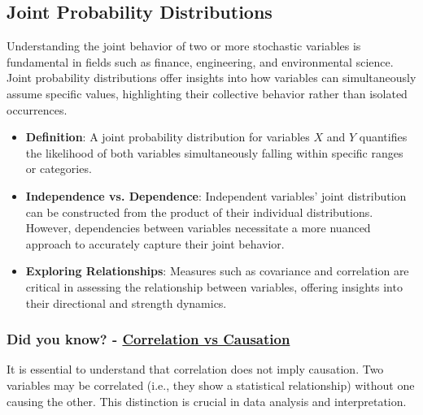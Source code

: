 \subsection*{Joint Probability Distributions}

Understanding the joint behavior of two or more stochastic variables is fundamental in fields such as finance, engineering, and environmental science. Joint probability distributions offer insights into how variables can simultaneously assume specific values, highlighting their collective behavior rather than isolated occurrences.


\begin{itemize}
    \item \textbf{Definition}: A joint probability distribution for variables \(X\) and \(Y\) quantifies the likelihood of both variables simultaneously falling within specific ranges or categories.
    \item \textbf{Independence vs. Dependence}: Independent variables' joint distribution can be constructed from the product of their individual distributions. However, dependencies between variables necessitate a more nuanced approach to accurately capture their joint behavior.
    \item \textbf{Exploring Relationships}: Measures such as covariance and correlation are critical in assessing the relationship between variables, offering insights into their directional and strength dynamics.
\end{itemize}

\subsubsection*{Did you know? - \href{http://www.tylervigen.com/spurious-correlations}{Correlation vs Causation}}
\begin{mdframed}[backgroundcolor=gray!20] 
It is essential to understand that correlation does not imply causation. Two variables may be correlated (i.e., they show a statistical relationship) without one causing the other. This distinction is crucial in data analysis and interpretation.
\end{mdframed} 

